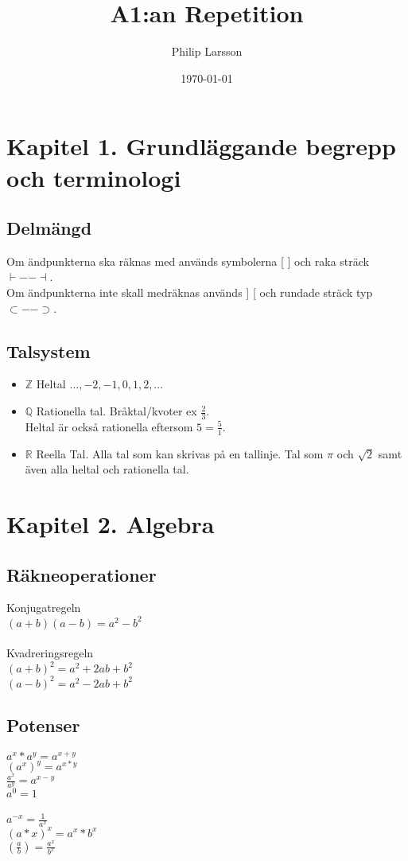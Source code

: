 \documentclass[11pt]{article}
\title{A1:an Repetition}
\author{Philip Larsson}
\date{\today}
\begin{document}
\maketitle


\section{Kapitel 1. Grundläggande begrepp och terminologi}
\subsection{Delmängd}
Om ändpunkterna ska räknas med används symbolerna [ ] och raka sträck $\vdash -- \dashv$. \\
Om ändpunkterna inte skall medräknas används ] [ och rundade sträck typ $\subset -- \supset$.
\subsection{Talsystem}
\begin{itemize}
\item{$\mathbb{Z}$ Heltal $\dots , -2, -1, 0, 1, 2, \dots$}
\item{$\mathbb{Q}$ Rationella tal. Bråktal/kvoter ex $\frac{2}{3}$. \\
Heltal är också rationella eftersom $5 = \frac{5}{1}$.}
\item{$\mathbb{R}$ Reella Tal. Alla tal som kan skrivas på en tallinje. Tal som $\pi$ och $\sqrt{2}$ samt även alla heltal och rationella tal.}
\end{itemize}

\section{Kapitel 2. Algebra}
\subsection{Räkneoperationer}
Konjugatregeln \\
$(a+b)(a-b)=a^2-b^2$ \\ \\
Kvadreringsregeln \\
$(a+b)^2 = a^2 + 2ab + b^2$ \\
$(a-b)^2 = a^2 - 2ab + b^2$
\subsection{Potenser}
$a^x * a^y = a^{x+y}$ \\
$(a^x)^y = a^{x*y}$ \\
$\frac{a^x}{a^y} = a^{x-y}$ \\
$a^0 = 1$ \\ \\
$a^{-x} = \frac{1}{a^x} $ \\
$(a * x)^x = a^x * b^x$ \\
$(\frac{a}{b}) = \frac{a^x}{b^x}$
\end{document}
